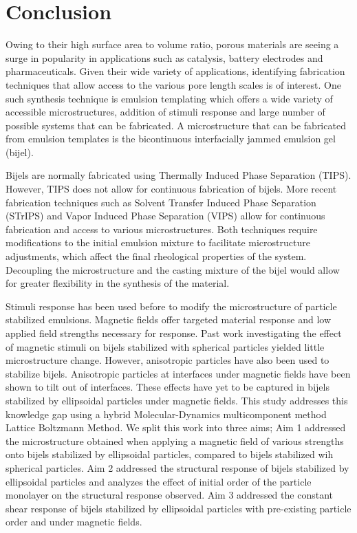 \section{Conclusion}

Owing to their high surface area to volume ratio, porous materials are seeing a surge in popularity in applications
such as catalysis, battery electrodes and pharmaceuticals. Given their wide variety of applications, identifying 
fabrication techniques that allow access to the various pore length scales is of interest. One such synthesis technique
is emulsion templating which offers a wide variety of accessible microstructures, addition of stimuli response and 
large number of possible systems that can be fabricated. A microstructure that can be fabricated from emulsion templates
is the bicontinuous interfacially jammed emulsion gel (bijel). 

Bijels are normally fabricated using Thermally Induced Phase Separation (TIPS). However, TIPS does not allow for continuous
fabrication of bijels. More recent fabrication techniques such as Solvent Transfer Induced Phase Separation (STrIPS) and 
Vapor Induced Phase Separation (VIPS) allow for continuous fabrication and access to various microstructures. Both techniques
require modifications to the initial emulsion mixture to facilitate microstructure adjustments, which affect the final rheological
properties of the system. Decoupling the microstructure and the casting mixture of the bijel would allow for greater flexibility
in the synthesis of the material.

Stimuli response has been used before to modify the microstructure of particle stabilized emulsions. Magnetic fields offer
targeted material response and low applied field strengths necessary for response. Past work investigating the effect of magnetic
stimuli on bijels stabilized with spherical particles yielded little microstructure change. However, anisotropic particles have
also been used to stabilize bijels. Anisotropic particles at interfaces under magnetic fields have been shown to tilt out of 
interfaces. These effects have yet to be captured in bijels stabilized by ellipsoidal particles under magnetic fields.
This study addresses this knowledge gap using a hybrid Molecular-Dynamics multicomponent method Lattice Boltzmann Method.
We split this work into three aims; Aim 1 addressed the microstructure obtained when applying a magnetic field of various strengths 
onto bijels stabilized by ellipsoidal particles, compared to bijels stabilized wih spherical particles. Aim 2 addressed the 
structural response of bijels stabilized by ellipsoidal particles and analyzes the effect of initial order of the particle monolayer
on the structural response observed. Aim 3 addressed the constant shear response of bijels stabilized by ellipsoidal particles
with pre-existing particle order and under magnetic fields.

